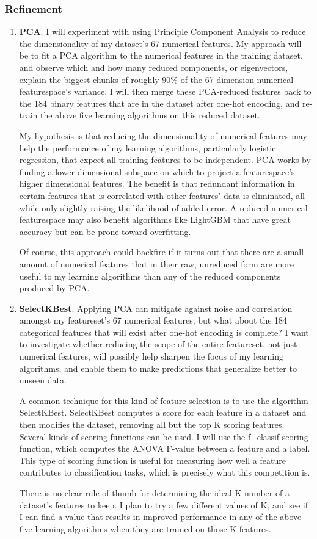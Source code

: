 \documentclass[12pt, letterpaper]{article}
\begin{document}
\subsubsection{Refinement}
\begin{enumerate}
  \item \textbf{PCA}. I will experiment with using Principle Component Analysis to reduce the dimensionality of my dataset's 67 numerical features. My approach will be to fit a PCA algorithm to the numerical features in the training dataset, and observe which and how many reduced components, or eigenvectors, explain the biggest chunks of roughly 90\% of the 67-dimension numerical featurespace's variance. I will then merge these PCA-reduced features back to the 184 binary features that are in the dataset after one-hot encoding, and re-train the above five learning algorithms on this reduced dataset.

  My hypothesis is that reducing the dimensionality of numerical features may help the performance of my learning algorithms, particularly logistic regression, that expect all training features to be independent. PCA works by finding a lower dimensional subspace on which to project a featurespace's higher dimensional features. The benefit is that redundant information in certain features that is correlated with other features' data is eliminated, all while only slightly raising the likelihood of added error. A reduced numerical featurespace may also benefit algorithms like LightGBM that have great accuracy but can be prone toward overfitting.

  Of course, this approach could backfire if it turns out that there are a small amount of numerical features that in their raw, unreduced form are more useful to my learning algorithms than any of the reduced components produced by PCA.
  \item \textbf{SelectKBest}. Applying PCA can mitigate against noise and correlation amongst my featureset's 67 numerical features, but what about the 184 categorical features that will exist after one-hot encoding is complete? I want to investigate whether reducing the scope of the entire featureset, not just numerical features, will possibly help sharpen the focus of my learning algorithms, and enable them to make predictions that generalize better to unseen data.

  A common technique for this kind of feature selection is to use the algorithm SelectKBest. SelectKBest computes a score for each feature in a dataset and then modifies the dataset, removing all but the top K scoring features. Several kinds of scoring functions can be used. I will use the f_classif scoring function, which computes the ANOVA F-value between a feature and a label. This type of scoring function is useful for measuring how well a feature contributes to classification tasks, which is precisely what this competition is.

  There is no clear rule of thumb for determining the ideal K number of a dataset's features to keep. I plan to try a few different values of K, and see if I can find a value that results in improved performance in any of the above five learning algorithms when they are trained on those K features.
\end{enumerate}
\end{document}
